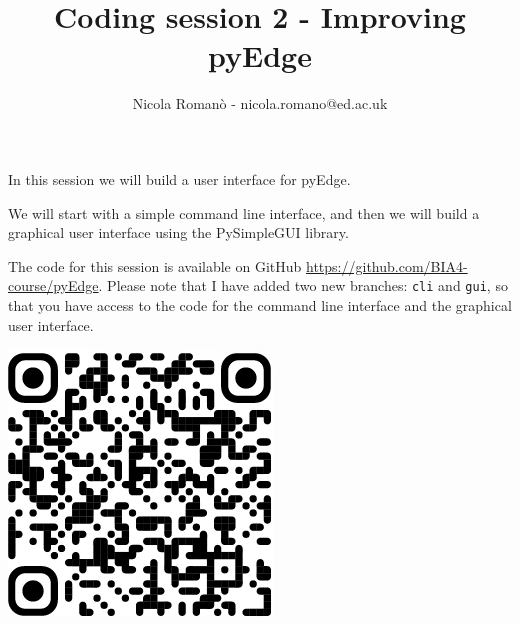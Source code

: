 \documentclass[9pt, aspectratio=169]{beamer}
\author{Nicola Roman\`o - nicola.romano@ed.ac.uk}
\title{Coding session 2 - Improving pyEdge}
\date{}
\begin{document}

\begin{frame}
    \titlepage
\end{frame}

\begin{frame}
    In this session we will build a user interface for pyEdge.

    We will start with a simple command line interface, and then we will build a graphical user interface using the PySimpleGUI library.

    The code for this session is available on GitHub \url{https://github.com/BIA4-course/pyEdge}. Please note that I have added two new branches: \texttt{cli} and \texttt{gui}, so that you have access to the code for the command line interface and the graphical user interface.

    \centering
    \includegraphics[width=.2\textwidth]{pyEdgeQR.png}
\end{frame}
\end{document}
